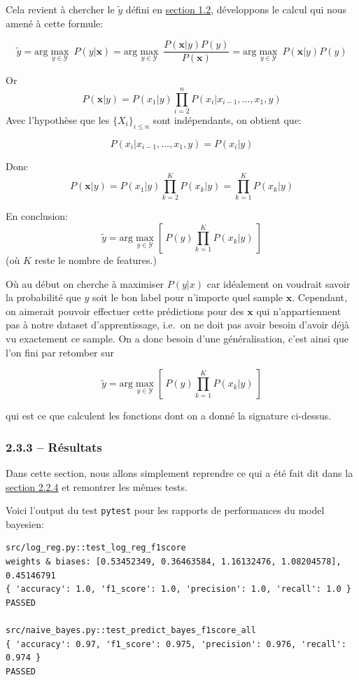 \documentclass[
]{article}
\begin{document}
Cela revient à chercher le \(\tilde{y}\) défini en
\href{#naive-bayes}{section 1.2}, développons le calcul qui nous amené à
cette formule:

\[
\tilde{y}  = \text{arg}\max_{y \in \mathcal{Y}}\ P(y|\mathbf{x}) = \text{arg}\max_{y \in \mathcal{Y}}\ \frac{P(\mathbf{x}|y)  P(y)}{P(\mathbf{x})} =  \text{arg}\max_{y \in \mathcal{Y}}\ P(\mathbf{x}| y)P(y)
\]

Or \[ 
P(\mathbf{x}| y) = P(x_1 | y) \prod_{i = 2}^{n}{P(x_i | x_{i-1}, \ldots, x_1, y)}
\] Avec l'hypothèse que les \(\{X_i\}_{i \leq n}\) sont indépendants, on
obtient que:

\[P(x_i | x_{i-1}, \ldots, x_1, y) = P(x_i | y)\]

Donc
\[P(\mathbf{x}|y) = P(x_1 | y) \prod_{k = 2}^{K}{P(x_k | y)} = \prod_{k=1}^K{P(x_k | y)}\]

En conclusion:
\[ \tilde{y} = \text{arg}\max_{y \in \mathcal{Y}} \left[\  P(y) \prod_{k = 1}^K{P(x_k | y)}\  \right] \]
(où \(K\) reste le nombre de features.)

Où au début on cherche à maximiser \(P(y | x)\) car idéalement on
voudrait savoir la probabilité que \(y\) soit le bon label pour
n'importe quel sample \(\mathbf{x}\). Cependant, on aimerait pouvoir
effectuer cette prédictions pour des \(\mathbf{x}\) qui n'appartiennent
pas à notre dataset d'apprentissage, i.e.~on ne doit pas avoir besoin
d'avoir déjà vu exactement ce sample. On a donc besoin d'une
généralisation, c'est ainsi que l'on fini par retomber sur

\[ \tilde{y} = \text{arg}\max_{y \in \mathcal{Y}} \left[\  P(y) \prod_{k = 1}^K{P(x_k | y)}\  \right] \]

qui est ce que calculent les fonctions dont on a donné la signature
ci-dessus.

\hypertarget{ruxe9sultats-1}{%
\subsubsection{2.3.3 -- Résultats}\label{ruxe9sultats-1}}

Dans cette section, nous allons simplement reprendre ce qui a été fait
dit dans la \href{#ruxe9sultats}{section 2.2.4} et remontrer les mêmes
tests.

Voici l'output du test \texttt{pytest} pour les rapports de performances
du model bayesien:

\begin{lstlisting}
src/log_reg.py::test_log_reg_f1score 
weights & biases: [0.53452349, 0.36463584, 1.16132476, 1.08204578], 0.45146791  
{ 'accuracy': 1.0, 'f1_score': 1.0, 'precision': 1.0, 'recall': 1.0 }
PASSED

src/naive_bayes.py::test_predict_bayes_f1score_all  
{ 'accuracy': 0.97, 'f1_score': 0.975, 'precision': 0.976, 'recall': 0.974 }
PASSED
\end{lstlisting}
\end{document}
